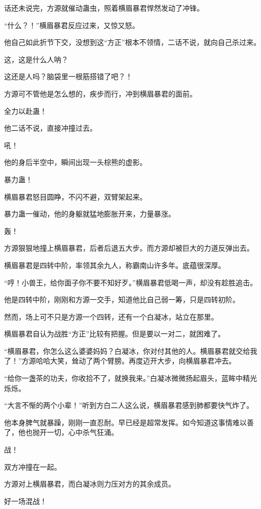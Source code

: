 \begin{this_body}
话还未说完，方源就催动蛊虫，照着横眉暴君悍然发动了冲锋。

“什么？！”横眉暴君反应过来，又惊又怒。

他自己如此折节下交，没想到这“方正”根本不领情，二话不说，就向自己杀过来。

这，这是什么人呐？

这还是人吗？脑袋里一根筋搭错了吧？！

方源可不管他是怎么想的，疾步而行，冲到横眉暴君的面前。

全力以赴蛊！

他二话不说，直接冲撞过去。

吼！

他的身后半空中，瞬间出现一头棕熊的虚影。

暴力蛊！

横眉暴君怒目圆睁，不闪不避，双臂架起来。

暴力蛊一催动，他的身躯就猛地膨胀开来，力量暴涨。

轰！

方源狠狠地撞上横眉暴君，后者后退五大步。而方源却被巨大的力道反弹出去。

横眉暴君是四转中阶，率领其余九人，称霸南山许多年。底蕴很深厚。

“哼！小兽王，给你面子你不要不知好歹。”横眉暴君低喝一声，却没有趁胜追击。

他是四转中阶，刚刚和方源一交手，知道他比自己弱一筹，只是四转初阶。

然而，场上可不只是方源一个四转，还有一个白凝冰，站立在那里。

横眉暴君自认为战胜“方正”比较有把握。但是要以一对二，就困难了。

“横眉暴君，你怎么这么婆婆妈妈？白凝冰，你对付其他的人。横眉暴君就交给我了！”方源哈哈大笑，耸动了两个臂膀。再度迈开大步，向横眉暴君冲去。

“给你一盏茶的功夫，你收拾不了，就换我来。”白凝冰微微扬起眉头，蓝眸中精光烁烁。

“大言不惭的两个小辈！”听到方白二人这么说，横眉暴君感到肺都要快气炸了。

他本身脾气就暴躁，刚刚一直忍耐。早已经是超常发挥。如今知道这事情难以善了，他也抛开一切，心中杀气狂涌。

战！

双方冲撞在一起。

方源对上横眉暴君，而白凝冰则力压对方的其余成员。

好一场混战！


\end{this_body}

